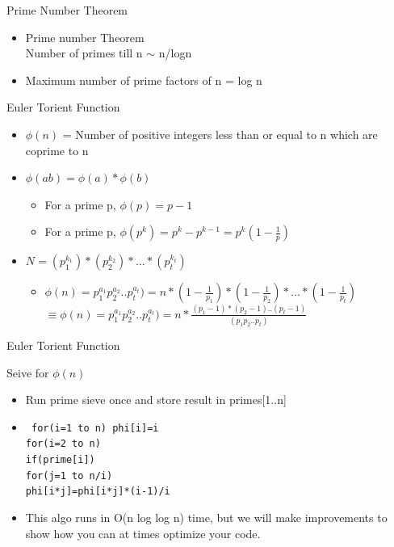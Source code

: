 \documentclass{beamer}
\begin{document}
\begin{frame}[<+->]{Prime Number Theorem}
  \begin{block}{}
  \begin{itemize}
      \item Prime number Theorem\\
      Number of primes till n $\sim$ n/logn
      \item Maximum number of prime factors of n = log n
  \end{itemize}
\end{block}
\end{frame}

\begin{frame}[<+->]{Euler Torient Function}
  \begin{block}{}
  \begin{itemize}
    \item $\phi(n)$ = Number of positive integers less than or equal to n which are coprime to n
    \item $\phi(ab) = \phi(a)*\phi(b)$
      \begin{itemize}
	\item For a prime p, $\phi(p) = p-1$
	\item For a prime p, $\phi(p^k) = p^k-p^{k-1} = p^k(1-\frac{1}{p})$
      \end{itemize}
    \item $N = (p_1^{k_1})*(p_2^{k_2})*...*(p_t^{k_t})$
      \begin{itemize}
	\item $\phi(n)=p_1^{a_1}p_2^{a_2}.. p_t^{a_t} ) = n*(1-\frac{1}{p_1})*(1-\frac{1}{p_2})* \dots *(1-\frac{1}{p_t})$\\
	$\equiv \phi(n)=p_1^{a_1}p_2^{a_2}.. p_t^{a_t} ) = n*\frac{(p_1-1)*(p_2-1)..(p_t-1)}{(p_1 p_2..p_t)}$
      \end{itemize}
  \end{itemize}
\end{block}
\end{frame}

\begin{frame}[<+->]{Euler Torient Function}
  \begin{block}{Seive for $\phi(n)$}
  \begin{itemize}
    \item Run prime sieve once and store result in primes[1..n]
    \item 
    \tt{
	for(i=1 to n) phi[i]=i\\
	for(i=2 to n)\\
	  \hspace{2mm} if(prime[i])\\
	    \hspace{5mm} for(j=1 to n/i)\\
	      \hspace{8mm} phi[i*j]=phi[i*j]*(i-1)/i
	}
    \item This algo runs in O(n log log n) time, but we will make improvements to show how you can at times optimize your code.
  \end{itemize}
\end{block}
\end{frame}
\end{document}
